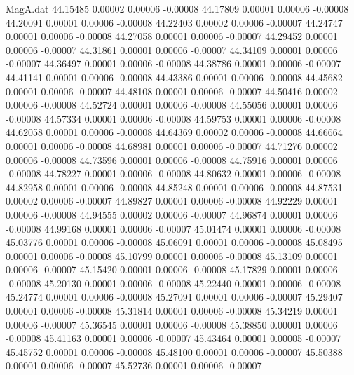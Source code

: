 \begin{filecontents}{MagA.dat}
  44.15485    0.00002    0.00006   -0.00008
  44.17809    0.00001    0.00006   -0.00008
  44.20091    0.00001    0.00006   -0.00008
  44.22403    0.00002    0.00006   -0.00007
  44.24747    0.00001    0.00006   -0.00008
  44.27058    0.00001    0.00006   -0.00007
  44.29452    0.00001    0.00006   -0.00007
  44.31861    0.00001    0.00006   -0.00007
  44.34109    0.00001    0.00006   -0.00007
  44.36497    0.00001    0.00006   -0.00008
  44.38786    0.00001    0.00006   -0.00007
  44.41141    0.00001    0.00006   -0.00008
  44.43386    0.00001    0.00006   -0.00008
  44.45682    0.00001    0.00006   -0.00007
  44.48108    0.00001    0.00006   -0.00007
  44.50416    0.00002    0.00006   -0.00008
  44.52724    0.00001    0.00006   -0.00008
  44.55056    0.00001    0.00006   -0.00008
  44.57334    0.00001    0.00006   -0.00008
  44.59753    0.00001    0.00006   -0.00008
  44.62058    0.00001    0.00006   -0.00008
  44.64369    0.00002    0.00006   -0.00008
  44.66664    0.00001    0.00006   -0.00008
  44.68981    0.00001    0.00006   -0.00007
  44.71276    0.00002    0.00006   -0.00008
  44.73596    0.00001    0.00006   -0.00008
  44.75916    0.00001    0.00006   -0.00008
  44.78227    0.00001    0.00006   -0.00008
  44.80632    0.00001    0.00006   -0.00008
  44.82958    0.00001    0.00006   -0.00008
  44.85248    0.00001    0.00006   -0.00008
  44.87531    0.00002    0.00006   -0.00007
  44.89827    0.00001    0.00006   -0.00008
  44.92229    0.00001    0.00006   -0.00008
  44.94555    0.00002    0.00006   -0.00007
  44.96874    0.00001    0.00006   -0.00008
  44.99168    0.00001    0.00006   -0.00007
  45.01474    0.00001    0.00006   -0.00008
  45.03776    0.00001    0.00006   -0.00008
  45.06091    0.00001    0.00006   -0.00008
  45.08495    0.00001    0.00006   -0.00008
  45.10799    0.00001    0.00006   -0.00008
  45.13109    0.00001    0.00006   -0.00007
  45.15420    0.00001    0.00006   -0.00008
  45.17829    0.00001    0.00006   -0.00008
  45.20130    0.00001    0.00006   -0.00008
  45.22440    0.00001    0.00006   -0.00008
  45.24774    0.00001    0.00006   -0.00008
  45.27091    0.00001    0.00006   -0.00007
  45.29407    0.00001    0.00006   -0.00008
  45.31814    0.00001    0.00006   -0.00008
  45.34219    0.00001    0.00006   -0.00007
  45.36545    0.00001    0.00006   -0.00008
  45.38850    0.00001    0.00006   -0.00008
  45.41163    0.00001    0.00006   -0.00007
  45.43464    0.00001    0.00005   -0.00007
  45.45752    0.00001    0.00006   -0.00008
  45.48100    0.00001    0.00006   -0.00007
  45.50388    0.00001    0.00006   -0.00007
  45.52736    0.00001    0.00006   -0.00007

\end{filecontents}
